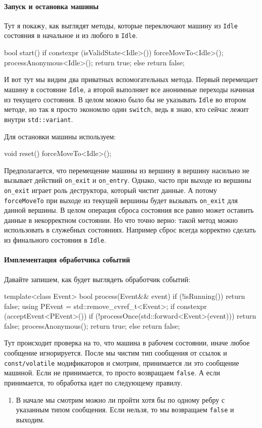\documentclass{article}
\begin{document}
{\paragraph{Запуск и остановка машины}

Тут я покажу, как выглядят методы, которые переключают машину из \verb"Idle" состояния в начальное и из любого в \verb"Idle".
\begin{cppcode}
bool start() {
  if constexpr (isValidState<Idle>()) {
    forceMoveTo<Idle>();
    processAnonymous<Idle>();
    return true;
  } else {
    return false;
  }
}
\end{cppcode}
И вот тут мы видим два приватных вспомогательных метода.
Первый перемещает машину в состояние \verb"Idle", а второй выполняет все анонимные переходы начиная из текущего состояния.
В целом можно было бы не указывать \verb"Idle" во втором методе, но так я просто экономлю один \verb"switch", ведь я знаю, кто сейчас лежит внутри \verb"std::variant".

Для остановки машины используем:
\begin{cppcode}
  void reset() {
    forceMoveTo<Idle>();
  }
\end{cppcode}
Предполагается, что перемещение машины из вершину в вершину насильно не вызывает действий \verb"on_exit" и \verb"on_entry".
Однако, часто при выходе из вершины \verb"on_exit" играет роль деструктора, который чистит данные.
А потому \verb"forceMoveTo" при выходе из текущей вершины будет вызывать \verb"on_exit" для данной вершины.
В целом операция сброса состояния все равно может оставить данные в некорректном состоянии.
Но что точно верно: такой метод можно использовать в служебных состояниях.
Например сброс всегда корректно сделать из финального состояния в \verb"Idle".

\paragraph{Имплементация обработчика событий}

Давайте запишем, как будет выглядеть обработчик событий:
\begin{cppcode}
template<class Event>
bool process(Event&& event) {
  if (!isRunning())
    return false;
  using PEvent = std::remove_cvref_t<Event>;
  if constexpr (acceptEvent<PEvent>()) {
    if (!processOnce(std::forward<Event>(event))) {
      return false;
    }
    processAnonymous();
    return true;
  } else {
    return false;
  }
}
\end{cppcode}
Тут происходит проверка на то, что машина в рабочем состоянии, иначе любое сообщение игнорируется.
После мы чистим тип сообщения от ссылок и \verb"const/volatile" модификаторов и смотрим, принимается ли это сообщение машиной.
Если не принимается, то просто возвращаем \verb"false".
А если принимается, то обработка идет по следующему правилу.
\begin{enumerate}
\item В начале мы смотрим можно ли пройти хотя бы по одному ребру с указанным типом сообщения.
Если нельзя, то мы возвращаем \verb"false" и выходим.


\end{enumerate}}
\end{document}
